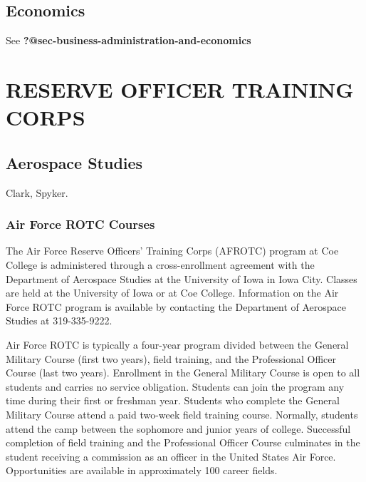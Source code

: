 \documentclass[
  letterpaper,
]{scrbook}
\begin{document}
\hypertarget{sec-economics}{%
\section{Economics}\label{sec-economics}}

See \textbf{?@sec-business-administration-and-economics}

\hypertarget{reserve-officer-training-corps}{%
\chapter{RESERVE OFFICER TRAINING
CORPS}\label{reserve-officer-training-corps}}

\hypertarget{aerospace-studies}{%
\section{Aerospace Studies}\label{aerospace-studies}}

Clark, Spyker.

\hypertarget{air-force-rotc-courses}{%
\subsection{Air Force ROTC Courses}\label{air-force-rotc-courses}}

The Air Force Reserve Officers' Training Corps (AFROTC) program at Coe
College is administered through a cross-enrollment agreement with the
Department of Aerospace Studies at the University of Iowa in Iowa City.
Classes are held at the University of Iowa or at Coe College.
Information on the Air Force ROTC program is available by contacting the
Department of Aerospace Studies at 319-335-9222.

Air Force ROTC is typically a four-year program divided between the
General Military Course (first two years), field training, and the
Professional Officer Course (last two years). Enrollment in the General
Military Course is open to all students and carries no service
obligation. Students can join the program any time during their first or
freshman year. Students who complete the General Military Course attend
a paid two-week field training course. Normally, students attend the
camp between the sophomore and junior years of college. Successful
completion of field training and the Professional Officer Course
culminates in the student receiving a commission as an officer in the
United States Air Force. Opportunities are available in approximately
100 career fields.
\end{document}
